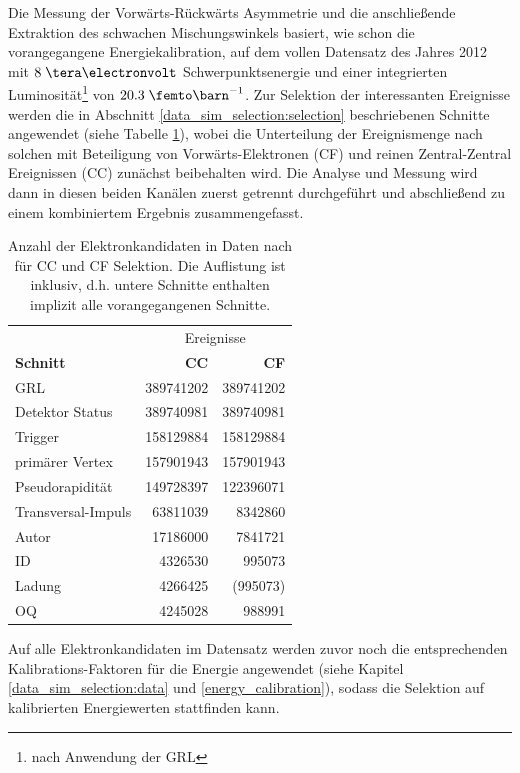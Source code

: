 Die Messung der Vorwärts-Rückwärts Asymmetrie und die anschließende Extraktion
des schwachen Mischungswinkels basiert, wie schon die vorangegangene
Energiekalibration, auf dem vollen Datensatz des Jahres 2012 mit $8\TeV$
Schwerpunktsenergie und einer integrierten Luminosität\footnote{nach Anwendung
der \ac{GRL}} von $20.3\fb^{-1}$. Zur Selektion der interessanten Ereignisse
werden die in Abschnitt \ref{data_sim_selection:selection} beschriebenen
Schnitte angewendet (siehe Tabelle \ref{tab:data_selection}), wobei die
Unterteilung der Ereignismenge nach solchen mit Beteiligung von
Vorwärts-Elektronen (CF) und reinen Zentral-Zentral Ereignissen (CC) zunächst
beibehalten wird. Die Analyse und Messung wird dann in diesen beiden Kanälen
zuerst getrennt durchgeführt und abschließend zu einem kombiniertem Ergebnis
zusammengefasst.
\begin{table} [h]
    \centering
    \begin{tabular}{|l|r|r|}
        \hline
        & \multicolumn{2}{|c|}{Ereignisse}   \\
        \textbf{Schnitt} & \textbf{CC} & \textbf{CF} \\  %
        \hline\hline
        \ac{GRL}           & 389741202 & 389741202   \\  %
        Detektor Status    & 389740981 & 389740981   \\  %
        Trigger            & 158129884 & 158129884   \\  %
        primärer Vertex    & 157901943 & 157901943   \\  %
        Pseudorapidität    & 149728397 & 122396071   \\  %
        Transversal-Impuls &  63811039 &   8342860   \\  %
        Autor              &  17186000 &   7841721   \\  %
        ID                 &   4326530 &    995073   \\  %
        Ladung             &   4266425 &  (995073)   \\  %
        OQ                 &   4245028 &    988991   \\  %
        \hline
    \end{tabular}
    \caption[Anzahl der Ereignisse in Daten für CC und CF Selektion]
        {Anzahl der Elektronkandidaten in Daten nach für CC und CF Selektion.
        Die Auflistung ist inklusiv, d.h. untere Schnitte enthalten implizit
        alle vorangegangenen Schnitte.}
    \label{tab:data_selection}
\end{table}
Auf alle Elektronkandidaten im Datensatz werden zuvor noch die entsprechenden
Kalibrations-Faktoren für die Energie angewendet (siehe Kapitel
\ref{data_sim_selection:data} und \ref{energy_calibration}), sodass die
Selektion auf kalibrierten Energiewerten stattfinden kann.

